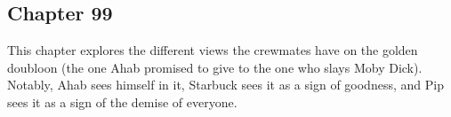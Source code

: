 \subsection{Chapter 99}

This chapter explores the different views the crewmates have on the golden
doubloon (the one Ahab promised to give to the one who slays Moby Dick).
Notably, Ahab sees himself in it, Starbuck sees it as a sign of goodness, and
Pip sees it as a sign of the demise of everyone.
